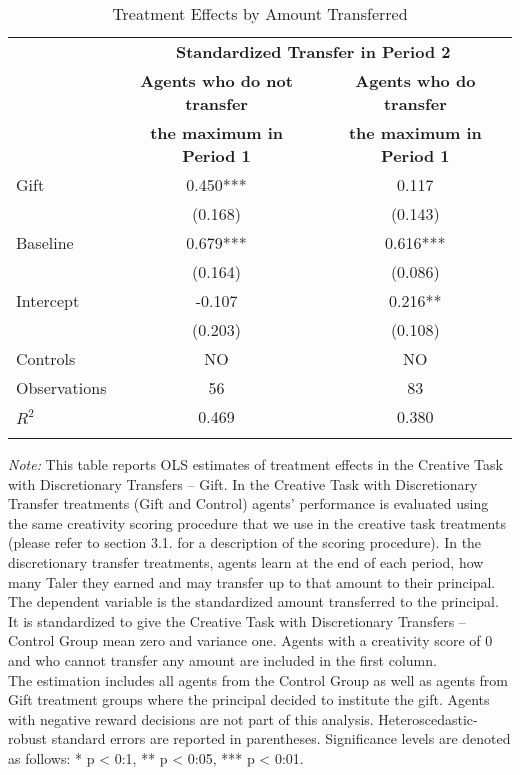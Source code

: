 \begin{table}[h]%
\setlength\tabcolsep{2pt}
\caption{Treatment Effects by Amount Transferred}
\label{tab:TransferSplit}
\begin{center}%
{\small\renewcommand{\arraystretch}{1}%
\begin{tabular}{lcc}
\hline\hline\noalign{\smallskip}
 & \multicolumn{2}{c}{\bf Standardized Transfer in Period 2} \\
\cline{2-3} 
 & \bf Agents who do not transfer & \bf Agents who do transfer \\
 & \bf the maximum in Period 1 & \bf the maximum in Period 1 \\
\hline\noalign{\smallskip}
Gift                &       0.450***&       0.117   \\
                    &     (0.168)   &     (0.143)   \\
Baseline            &       0.679***&       0.616***\\
                    &     (0.164)   &     (0.086)   \\
Intercept           &      -0.107   &       0.216** \\
                    &     (0.203)   &     (0.108)   \\
\hline
\noalign{\smallskip}
Controls & NO & NO  \\
\hline
\noalign{\smallskip}
Observations        &          56   &          83   \\
$R^2$               &       0.469   &       0.380   \\
\hline\hline\noalign{\medskip}
\end{tabular}}
\begin{minipage}{\textwidth}
\footnotesize {\it Note:} This table reports OLS estimates of treatment effects in the Creative Task with Discretionary Transfers -- Gift. 
In the Creative Task with Discretionary Transfer treatments (Gift and Control) agents’ performance is evaluated using the same creativity scoring procedure that we use in the creative task treatments (please refer to section 3.1. for a description of the scoring procedure). 
In the discretionary transfer treatments, agents learn at the end of each period, how many Taler they earned and may transfer up to that amount to their principal. 
The dependent variable is the standardized amount transferred to the principal. It is standardized to give the Creative Task with Discretionary Transfers -- Control Group mean zero and variance one. 
Agents with a creativity score of 0 and who cannot transfer any amount are included in the first column. \\
The estimation includes all agents from the Control Group as well as agents from Gift treatment groups where the principal decided to institute the gift. Agents with negative reward decisions are not part of this analysis. 
Heteroscedastic-robust standard errors are reported in parentheses. Significance levels are denoted as follows: * p < 0:1, ** p < 0:05, *** p < 0:01. 
\end{minipage}
\end{center}
\end{table}
